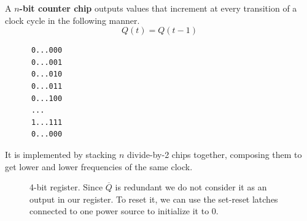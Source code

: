   \begin{definition}
    \label{def:counter-chip}
    A \textbf{$n$-bit counter chip} outputs values that increment at every transition of a clock cycle in the following manner. 
    \begin{equation}
      Q(t) = Q(t - 1)
    \end{equation}

    \begin{lstlisting}
      0...000 
      0...001
      0...010 
      0...011 
      0...100 
      ...
      1...111 
      0...000
    \end{lstlisting}

    It is implemented by stacking $n$ divide-by-2 chips together, composing them to get lower and lower frequencies of the same clock. 

    \begin{figure}[H]
      \centering 
      \caption{4-bit register. Since $\overline{Q}$ is redundant we do not consider it as an output in our register. To reset it, we can use the set-reset latches connected to one power source to initialize it to $0$. } 
    \end{figure}
  \end{definition}

